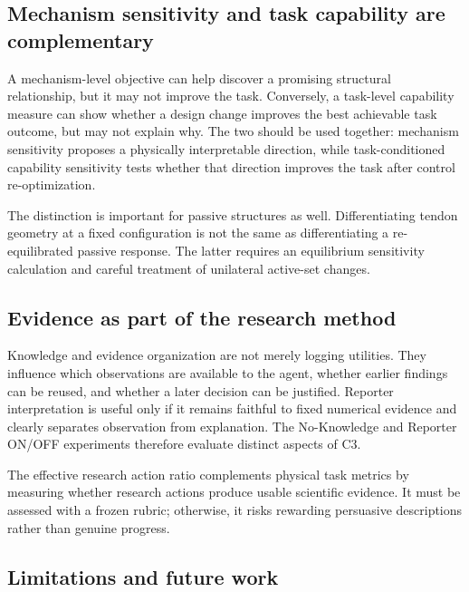\subsection{Mechanism sensitivity and task capability are complementary}

A mechanism-level objective can help discover a promising structural relationship, but it may not improve the task. Conversely, a task-level capability measure can show whether a design change improves the best achievable task outcome, but may not explain why. The two should be used together: mechanism sensitivity proposes a physically interpretable direction, while task-conditioned capability sensitivity tests whether that direction improves the task after control re-optimization.

The distinction is important for passive structures as well. Differentiating tendon geometry at a fixed configuration is not the same as differentiating a re-equilibrated passive response. The latter requires an equilibrium sensitivity calculation and careful treatment of unilateral active-set changes.

\subsection{Evidence as part of the research method}

Knowledge and evidence organization are not merely logging utilities. They influence which observations are available to the agent, whether earlier findings can be reused, and whether a later decision can be justified. Reporter interpretation is useful only if it remains faithful to fixed numerical evidence and clearly separates observation from explanation. The No-Knowledge and Reporter ON/OFF experiments therefore evaluate distinct aspects of C3.

The effective research action ratio complements physical task metrics by measuring whether research actions produce usable scientific evidence. It must be assessed with a frozen rubric; otherwise, it risks rewarding persuasive descriptions rather than genuine progress.

\subsection{Limitations and future work}

